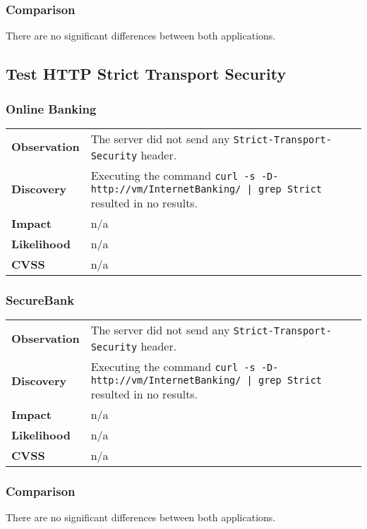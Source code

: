 \subsubsection*{Comparison}
There are no significant differences between both applications.


\clearpage
\subsection{Test HTTP Strict Transport Security}

\subsubsection*{Online Banking}

\begin{tabular}{l|p{10cm}}

\textbf{Observation} & The server did not send any \texttt{Strict-Transport-Security} header.  \\
\textbf{Discovery} & Executing the command \texttt{curl -s -D- http://vm/InternetBanking/ | grep Strict} resulted in no results. \\
\textbf{Impact} & n/a \\
\textbf{Likelihood} & n/a \\
\textbf{CVSS} & n/a \\
\end{tabular}


\subsubsection*{SecureBank}

\begin{tabular}{l|p{10cm}}

\textbf{Observation} & The server did not send any \texttt{Strict-Transport-Security} header.  \\
\textbf{Discovery} & Executing the command \texttt{curl -s -D- http://vm/InternetBanking/ | grep Strict} resulted in no results. \\
\textbf{Impact} & n/a \\
\textbf{Likelihood} & n/a \\
\textbf{CVSS} & n/a \\
\end{tabular}

\subsubsection*{Comparison}
There are no significant differences between both applications.

